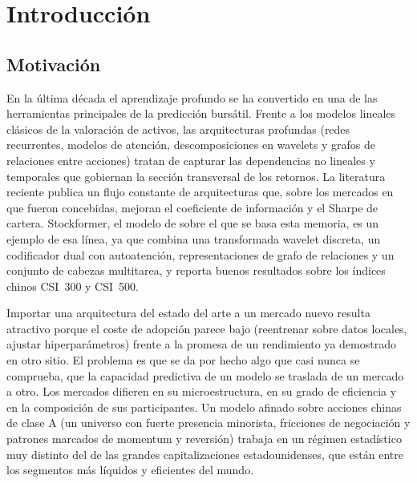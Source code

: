 \chapter{Introducción}\label{cap:intro}

\section{Motivación}

En la última década el aprendizaje profundo se ha convertido en una de las herramientas
principales de la predicción bursátil. Frente a los modelos lineales clásicos de la
valoración de activos, las arquitecturas profundas (redes recurrentes, modelos de
atención, descomposiciones en wavelets y grafos de relaciones entre acciones) tratan de
capturar las dependencias no lineales y temporales que gobiernan la sección transversal de
los retornos. La literatura reciente publica un flujo constante de arquitecturas que,
sobre los mercados en que fueron concebidas, mejoran el coeficiente de información y el
Sharpe de cartera. Stockformer, el modelo de \textcite{ma2024stockformer} sobre el que se
basa esta memoria, es un ejemplo de esa línea, ya que combina una transformada wavelet discreta,
un codificador dual con autoatención, representaciones de grafo de relaciones y un
conjunto de cabezas multitarea, y reporta buenos resultados sobre los índices chinos
CSI~300 y CSI~500.

Importar una arquitectura del estado del arte a un mercado nuevo resulta atractivo porque
el coste de adopción parece bajo (reentrenar sobre datos locales, ajustar
hiperparámetros) frente a la promesa de un rendimiento ya demostrado en otro sitio. El
problema es que se da por hecho algo que casi nunca se comprueba, que la capacidad
predictiva de un modelo se traslada de un mercado a otro. Los mercados difieren en su
microestructura, en su grado de eficiencia y en la composición de sus participantes. Un
modelo afinado sobre acciones chinas de clase A (un universo con fuerte presencia
minorista, fricciones de negociación y patrones marcados de momentum y reversión) trabaja
en un régimen estadístico muy distinto del de las grandes capitalizaciones
estadounidenses, que están entre los segmentos más líquidos y eficientes del mundo.

